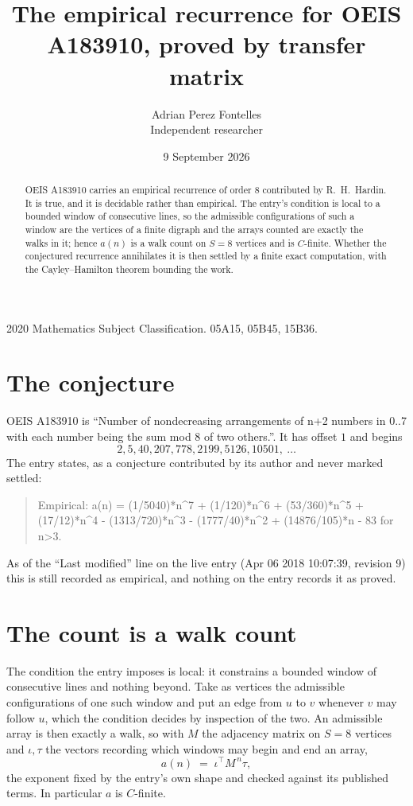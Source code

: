 \documentclass[11pt,a4paper]{article}
\title{The empirical recurrence for OEIS A183910, proved by transfer matrix}
\author{Adrian Perez Fontelles\\ \small Independent researcher}
\date{9 September 2026}
\theoremstyle{plain}
\theoremstyle{definition}
\begin{document}
\maketitle

\begin{abstract}
OEIS A183910 carries an empirical recurrence of order $8$ contributed by R.~H.~Hardin. It is
true, and it is decidable rather than empirical. The entry's condition is local to a bounded window of consecutive lines, so
the admissible configurations of such a window are the vertices of a finite digraph and the
arrays counted are exactly the walks in it; hence $a(n)$ is a walk count on $S=8$ vertices
and is $C$-finite. Whether the conjectured recurrence annihilates it is then settled by a
finite exact computation, with the Cayley--Hamilton theorem bounding the work.
\end{abstract}

\noindent\small 2020 Mathematics Subject Classification. 05A15, 05B45, 15B36.\normalsize

\section{The conjecture}

OEIS A183910 is ``Number of nondecreasing arrangements of n+2 numbers in 0..7 with each number being the sum mod 8 of two others.''. It has offset $1$ and begins
\[
2, 5, 40, 207, 778, 2199, 5126, 10501,\ \dots
\]
The entry states, as a conjecture contributed by its author and never marked settled:
\begin{quote}
Empirical: a(n) = (1/5040)*n\^{}7 + (1/120)*n\^{}6 + (53/360)*n\^{}5 + (17/12)*n\^{}4 - (1313/720)*n\^{}3 - (1777/40)*n\^{}2 + (14876/105)*n - 83 for n>3.
\end{quote}
As of the ``Last modified'' line on the live entry (Apr 06 2018 10:07:39, revision 9) this is still
recorded as empirical, and nothing on the entry records it as proved.

\section{The count is a walk count}

The condition the entry imposes is local: it constrains a bounded window of consecutive lines and nothing beyond. Take as
vertices the admissible configurations of one such window and put an edge from $u$ to $v$
whenever $v$ may follow $u$, which the condition decides by inspection of the two. An
admissible array is then exactly a walk, so with $M$ the adjacency matrix on $S=8$ vertices
and $\iota,\tau$ the vectors recording which windows may begin and end an array,
\[
a(n)\;=\;\iota^{\!\top}M^{\,n}\tau ,
\]
the exponent fixed by the entry's own shape and checked against its published terms. In
particular $a$ is $C$-finite.
\end{document}
